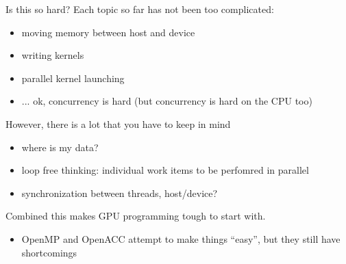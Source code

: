 
%
%

\begin{frame}[fragile]{}
    \begin{info}{Is this so hard?}
        Each topic so far has not been too complicated:
        \begin{itemize}
            \item moving memory between host and device
            \item writing kernels
            \item parallel kernel launching
            \item ... ok, concurrency is hard (but concurrency is hard on the CPU too)
        \end{itemize}
        However, there is a lot that you have to keep in mind
        \begin{itemize}
            \item where is my data?
            \item loop free thinking: individual work items to be perfomred in parallel
            \item synchronization between threads, host/device?
        \end{itemize}
        Combined this makes GPU programming tough to start with.
        \begin{itemize}
            \item OpenMP and OpenACC attempt to make things ``easy'', but they still have shortcomings
        \end{itemize}
    \end{info}

\end{frame}

